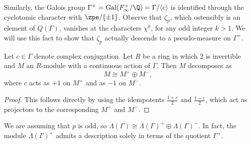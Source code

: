 \documentclass[a4paper,10pt, english, reqno]{smfart}
\newcommand{\CWnote}[1]{
	\begin{color}{red}
		\marginpar{$\spadesuit$} #1
		---CW
	\end{color}
}
\newcommand{\GG}{\Gamma}
\numberwithin{equation}{section}
\begin{document}
		


Similarly, the Galois group $\GG^+ = \mathrm{Gal}(F_\infty^+ / \Q) = \GG / \langle c \rangle$ is identified through the cyclotomic character with $\zpe / \{ \pm 1 \}$. Observe that $\zeta_p$, which ostensibly is an element of $Q(\GG)$, vanishes at the characters $\chi^k$, for any odd integer $k > 1$. We will use this fact to show that $\zeta_p$ actually descends to a pseudo-measure on $\GG^+$.

\begin{lemma} \label{lem:decompose plus minus}
	Let $c \in \GG$ denote complex conjugation. Let $R$ be a ring in which $2$ is invertible and $M$ an $R$-module with a continuous action of $\GG$. Then $M$ decomposes as
	\[M \cong M^+ \oplus M^-,\]
	where $c$ acts as $+1$ on $M^+$ and as $-1$ on $M^-$.
\end{lemma}

\begin{proof}
	This follows directly by using the idempotents $\frac{1+c}{2}$ and $\frac{1-c}{2}$, which act as projectors to the corresponding $M^+$ and $M^-$.
\end{proof}

We are assuming that $p$ is odd, so $\Lambda(\GG) \cong \Lambda(\GG)^+ \oplus \Lambda(\GG)^-$. In fact, the module $\Lambda(\GG)^+$ admits a description solely in terms of the quotient $\GG^+$.
\end{document}

